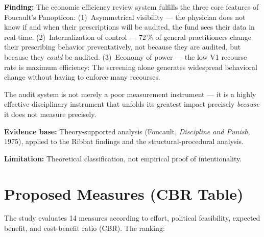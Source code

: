 \documentclass{umbruch-position}
\begin{document}
\textbf{Finding:} The economic efficiency review system fulfills the three core features of Foucault's Panopticon: (1)~Asymmetrical visibility --- the physician does not know if and when their prescriptions will be audited, the fund sees their data in real-time. (2)~Internalization of control --- 72\,\% of general practitioners change their prescribing behavior preventatively, not because they are audited, but because they \textit{could} be audited. (3)~Economy of power --- the low V1 recourse rate is maximum efficiency: The screening alone generates widespread behavioral change without having to enforce many recourses.

The audit system is not merely a poor measurement instrument --- it is a highly effective disciplinary instrument that unfolds its greatest impact precisely \textit{because} it does not measure precisely.

\textbf{Evidence base:} Theory-supported analysis (Foucault, \textit{Discipline and Punish}, 1975), applied to the Ribbat findings and the structural-procedural analysis.

\textbf{Limitation:} Theoretical classification, not empirical proof of intentionality.

\section{Proposed Measures (CBR Table)}

The study evaluates 14 measures according to effort, political feasibility, expected benefit, and cost-benefit ratio (CBR). The ranking:
\end{document}

